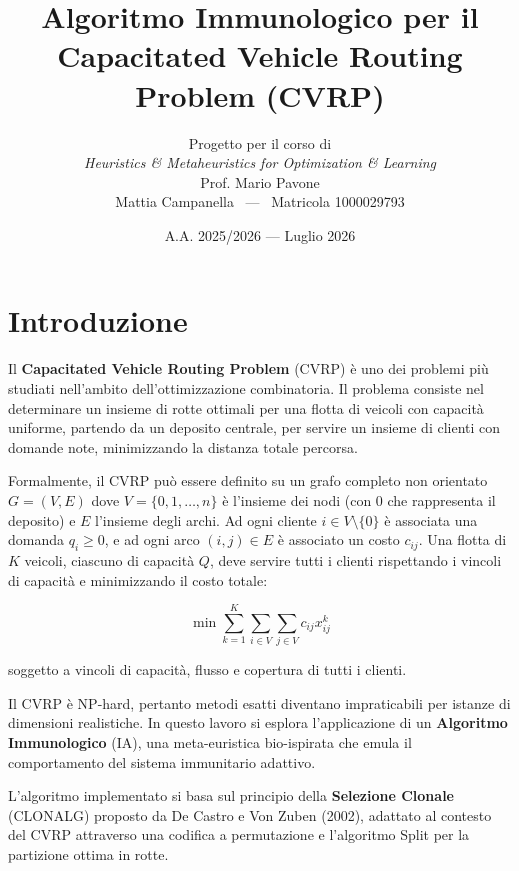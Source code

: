 \documentclass[a4paper,12pt]{article}
\title{\textbf{Algoritmo Immunologico per il\\Capacitated Vehicle Routing Problem (CVRP)}}
\author{%
    \normalsize Progetto per il corso di\\[2pt]
    \large\textit{Heuristics \& Metaheuristics for Optimization \& Learning}\\[4pt]
    \normalsize Prof. Mario Pavone\\[6pt]
    \normalsize Mattia Campanella \ --- \ Matricola 1000029793
}
\date{\normalsize A.A. 2025/2026 --- Luglio 2026}
\begin{document}
\maketitle

\vspace{1em}

\clearpage
\section{Introduzione}

Il \textbf{Capacitated Vehicle Routing Problem} (CVRP) è uno dei problemi più studiati nell'ambito dell'ottimizzazione combinatoria. Il problema consiste nel determinare un insieme di rotte ottimali per una flotta di veicoli con capacità uniforme, partendo da un deposito centrale, per servire un insieme di clienti con domande note, minimizzando la distanza totale percorsa.

Formalmente, il CVRP può essere definito su un grafo completo non orientato $G = (V, E)$ dove $V = \{0, 1, \dots, n\}$ è l'insieme dei nodi (con $0$ che rappresenta il deposito) e $E$ l'insieme degli archi. Ad ogni cliente $i \in V \setminus \{0\}$ è associata una domanda $q_i \geq 0$, e ad ogni arco $(i, j) \in E$ è associato un costo $c_{ij}$. Una flotta di $K$ veicoli, ciascuno di capacità $Q$, deve servire tutti i clienti rispettando i vincoli di capacità e minimizzando il costo totale:

\begin{equation}
\min \sum_{k=1}^{K} \sum_{i \in V} \sum_{j \in V} c_{ij} x_{ij}^k
\end{equation}

soggetto a vincoli di capacità, flusso e copertura di tutti i clienti.

Il CVRP è NP-hard, pertanto metodi esatti diventano impraticabili per istanze di dimensioni realistiche. In questo lavoro si esplora l'applicazione di un \textbf{Algoritmo Immunologico} (IA), una meta-euristica bio-ispirata che emula il comportamento del sistema immunitario adattivo.

L'algoritmo implementato si basa sul principio della \textbf{Selezione Clonale} (CLONALG) proposto da De Castro e Von Zuben (2002), adattato al contesto del CVRP attraverso una codifica a permutazione e l'algoritmo Split per la partizione ottima in rotte.

\end{document}
